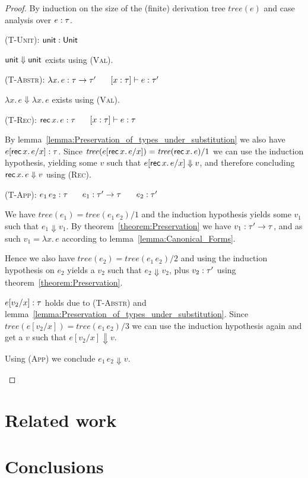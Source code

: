 \documentclass[12pt,a2paper,draft]{article}
\newcommand{\abstr}[2]{\ensuremath{\lambda{#1}.\,{#2}}}
\newcommand{\app}[2]{\ensuremath{{#1}\,{#2}}}
\newcommand{\rec}[2]{\ensuremath{{\normalfont\textsf{rec}}\,{#1}.\,{#2}}}
\newcommand{\unit}{\ensuremath{\normalfont\textsf{unit}}}
\newcommand{\Unit}{\ensuremath{\normalfont\textsf{Unit}}}
\newcommand{\tj}[2]{\mbox{\ensuremath{{#1}:{#2}}}}
\newcommand{\Tj}[3]{\mbox{\ensuremath{{#1}\vdash\tj{#2}{#3}}}}
\newcommand{\tree}[1]{\mathit{tree}(#1)}
\begin{document}
\begin{proof}
  By induction on the size of the (finite) derivation tree $\tree{e}$ and case analysis
  over $\tj{e}{\tau}$.
  \begin{description}
  \item \textsc{(T-Unit)}: $\tj{\unit}{\Unit}$

    $\unit \Downarrow \unit$ exists using \textsc{(Val)}.

  \item \textsc{(T-Abstr)}: $\tj{\abstr{x}{e}}{\tau \to \tau'}$ $\quad$ $\Tj{[x:\tau]}{e}{\tau'}$

    $\abstr{x}{e} \Downarrow \abstr{x}{e}$ exists using \textsc{(Val)}.

  \item \textsc{(T-Rec)}: $\tj{\rec{x}{e}}{\tau}$ $\quad$ $\Tj{[x:\tau]}{e}{\tau}$

    By lemma~\ref{lemma:Preservation_of_types_under_substitution}
    we also have $\tj{e[\rec{x}{e}/x]}{\tau}$. Since $\tree{e[\rec{x}{e}/x]} = \tree{\rec{x}{e}}/1$ we
    can use the induction hypothesis, yielding some $v$ such that $e[\rec{x}{e}/x] \Downarrow v$,
    and therefore concluding $\rec{x}{e} \Downarrow v$ using \textsc{(Rec)}.

  \item \textsc{(T-App)}: $\tj{\app{e_1}{e_2}}{\tau}$ $\quad$ $\tj{e_1}{\tau'\to\tau}$ $\quad$ $\tj{e_2}{\tau'}$

    We have $\tree{e_1} = \tree{\app{e_1}{e_2}}/1$ and the induction hypothesis yields
    some $v_1$ such that $e_1 \Downarrow v_1$. By theorem~\ref{theorem:Preservation} we
    have $\tj{v_1}{\tau'\to\tau}$, and as such $v_1 = \abstr{x}{e}$ according to lemma~\ref{lemma:Canonical_Forms}.

    Hence we also have $\tree{e_2} = \tree{\app{e_1}{e_2}}/2$ and using the induction hypothesis
    on $e_2$ yields a $v_2$ such that $e_2 \Downarrow v_2$, plus $\tj{v_2}{\tau'}$ using
    theorem~\ref{theorem:Preservation}.

    $\tj{e[v_2/x]}{\tau}$ holds due to \textsc{(T-Abstr)} and
    lemma~\ref{lemma:Preservation_of_types_under_substitution}. Since
    $\tree{e[v_2/x]} = \tree{\app{e_1}{e_2}}/3$ we can use the induction hypothesis again and
    get a $v$ such that $e[v_2/x] \Downarrow v$.

    Using \textsc{(App)} we conclude $\app{e_1}{e_2} \Downarrow v$.
  \end{description}
\end{proof}


\section{Related work}


\section{Conclusions}




\end{document}
